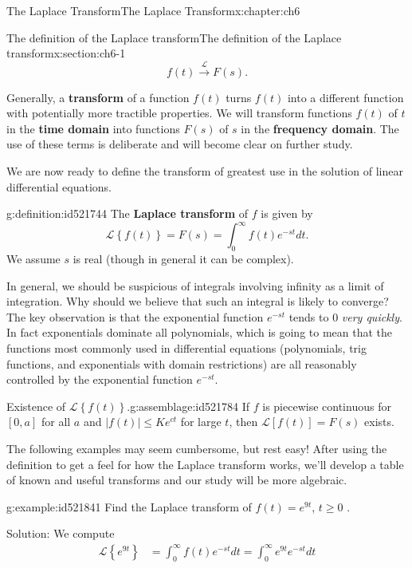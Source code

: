 \documentclass[oneside,10pt,]{book}
\newcommand{\terminology}[1]{\textbf{#1}}
\numberwithin{equation}{section}
\numberwithin{equation}{section}
\newcommand{\amp}{&}
\begin{document}
\begin{chapterptx}{The Laplace Transform}{}{The Laplace Transform}{}{}{x:chapter:ch6}
\begin{sectionptx}{The definition of the Laplace transform}{}{The definition of the Laplace transform}{}{}{x:section:ch6-1}
\begin{equation*}
f(t)\overset{\mathcal{L}}{\longrightarrow}F(s).
\end{equation*}
%
\par
Generally, a \terminology{transform} of a function \(f(t)\) turns \(f(t)\) into a different function with potentially more tractible properties. We will transform functions \(f(t)\) of \(t\) in the \terminology{time domain} into functions \(F(s)\) of \(s\) in the \terminology{frequency domain}. The use of these terms is deliberate and will become clear on further study.%
\par
We are now ready to define the transform of greatest use in the solution of linear differential equations.%
\begin{definition}{}{g:definition:id521744}%
The \terminology{Laplace transform} of \(f\) is given by%
\begin{equation*}
\mathcal{L}\left\{ f(t)\right\} =F(s)=\int_{0}^{\infty}f(t)e^{-st}dt.
\end{equation*}
We assume \(s\) is real (though in general it can be complex).%
\end{definition}
In general, we should be suspicious of integrals involving infinity as a limit of integration. Why should we believe that such an integral is likely to converge? The key observation is that the exponential function \(e^{-st}\) tends to \(0\) \emph{very quickly}. In fact exponentials dominate all polynomials, which is going to mean that the functions most commonly used in differential equations (polynomials, trig functions, and exponentials with domain restrictions) are all reasonably controlled by the exponential function \(e^{-st}\).%
\begin{assemblage}{Existence of \(\mathcal{L}\left\{ f(t)\right\} \).}{g:assemblage:id521784}%
If \(f\) is piecewise continuous for \(\left[0,a\right]\) for all \(a\) and            \(\left|f(t)\right|\leq Ke^{ct}\) for large \(t\), then \(\mathcal{L}\left[f(t)\right]=F(s)\) exists.%
\end{assemblage}
The following examples may seem cumbersome, but rest easy! After using the definition to get a feel for how the Laplace transform works, we'll develop a table of known and useful transforms and our study will be more algebraic.%
\begin{example}{}{g:example:id521841}%
Find the Laplace transform of \(f(t)=e^{9t}\), \(t\geq0\) .%
\par
Solution: We compute%
\begin{align*}
\mathcal{L}\left\{ e^{9t}\right\}  \amp =\int_{0}^{\infty}f(t)e^{-st}dt=\int_{0}^{\infty}e^{9t}e^{-st}dt\\

\end{align*}
\end{example}
\end{sectionptx}
\end{chapterptx}
\end{document}
